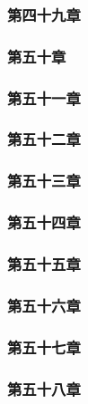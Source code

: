 \subsubsection{第四十九章}




\subsubsection{第五十章}



\subsubsection{第五十一章}



\subsubsection{第五十二章}



\subsubsection{第五十三章}



\subsubsection{第五十四章}



\subsubsection{第五十五章}



\subsubsection{第五十六章}



\subsubsection{第五十七章}



\subsubsection{第五十八章}



